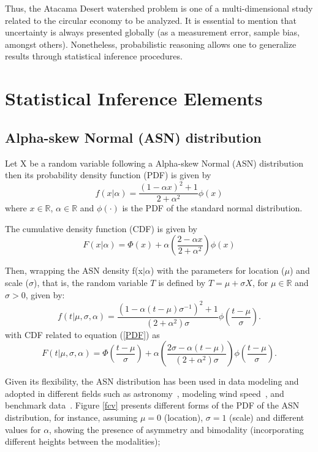 \documentclass[]{interact}
\theoremstyle{plain}%
\theoremstyle{definition}
\theoremstyle{remark}
\begin{document}
Thus, the Atacama Desert watershed problem is one of a multi-dimensional study related to the circular economy to be analyzed. It is essential to mention that uncertainty is always presented globally (as a measurement error, sample bias, amongst others). Nonetheless, probabilistic reasoning allows one to generalize results through statistical inference procedures.


\section{Statistical Inference Elements} \label{theorical}

\subsection{Alpha-skew Normal (ASN) distribution}

Let X be a random variable following a Alpha-skew Normal (ASN) distribution then its probability density function (PDF) is given by
\begin{equation*}
f(x|\alpha)=\frac{(1-\alpha x)^2+1}{2+\alpha^2}\phi(x)    
\end{equation*}
where $x\in\mathbb{R}$, $\alpha\in\mathbb{R}$ and $\phi(\cdot)$ is the PDF of the standard normal distribution. 

The cumulative density function (CDF) is given by
\begin{equation*}
F(x|\alpha)=\Phi(x)+\alpha\left(\frac{2-\alpha x}{2+\alpha^2}\right)\phi(x)    
\end{equation*}

Then, wrapping the ASN density f(x$| \alpha$) with the parameters for location ($\mu$) and scale ($\sigma$), that is, the random variable $T$ is defined by $T=\mu +\sigma X$, for $\mu\in\mathbb{R}$ and $\sigma>0$, given by:
\begin{equation}\label{PDF}
f(t|\mu,\sigma,\alpha)=\frac{(1-\alpha (t-\mu)\sigma^{-1})^2+1}{(2+\alpha^2)\sigma}\phi\left(\frac{t-\mu}{\sigma}\right).
\end{equation}
with CDF related to equation (\ref{PDF}) as
\begin{equation}\label{CDF}
F(t|\mu,\sigma,\alpha)=\Phi\left(\frac{t-\mu}{\sigma}\right)+\alpha\left(\frac{2\sigma-\alpha (t-\mu)}{(2+\alpha^2)\sigma}\right)\phi\left(\frac{t-\mu}{\sigma}\right)   .
\end{equation}

Given its flexibility, the ASN distribution has been used in data modeling and adopted in different fields such as astronomy~\cite{tarnopolski2016analysis}, modeling wind speed~\cite{yang2018modeling}, and benchmark data~\cite{ara2019multivariate}. Figure \ref{fcv} presents different forms of the PDF of the ASN distribution, for instance, assuming $\mu=0$ (location), $\sigma=1$ (scale) and different values for $\alpha$, showing the presence of asymmetry and bimodality (incorporating different heights between the modalities);
\end{document}
